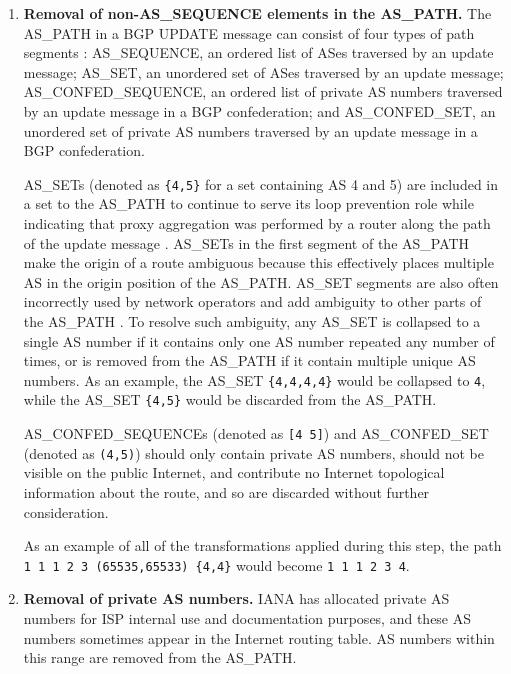 \begin{enumerate}
    \item{\textbf{Removal of non-AS\_SEQUENCE elements in the AS\_PATH.} The
    AS\_PATH in a BGP UPDATE message can consist of four types of path segments
    \cite{rfc5065}: AS\_SEQUENCE, an ordered list of ASes traversed by an
    update message; AS\_SET, an unordered set of ASes traversed by an update
    message; AS\_CONFED\_SEQUENCE, an ordered list of private AS numbers
    traversed by an update message in a BGP confederation; and AS\_CONFED\_SET,
    an unordered set of private AS numbers traversed by an update message in a
    BGP confederation.

    AS\_SETs (denoted as \verb!{4,5}! for a set containing AS 4 and 5) are
    included in a set to the AS\_PATH to continue to serve its loop prevention
    role while indicating that proxy aggregation was performed by a router along
    the path of the update message \cite{draft-deprecate-as-sets-04}. AS\_SETs
    in the first segment of the AS\_PATH make the origin of a route ambiguous
    because this effectively places multiple AS in the origin position of the
    AS\_PATH.  AS\_SET segments are also often incorrectly used by network
    operators and add ambiguity to other parts of the AS\_PATH
    \cite{draft-deprecate-as-sets-04}.  To resolve such ambiguity, any AS\_SET
    is collapsed to a single AS number if it contains only one AS number
    repeated any number of times, or is removed from the AS\_PATH if it contain
    multiple unique AS numbers. As an example, the AS\_SET \verb!{4,4,4,4}!
    would be collapsed to \verb!4!, while the AS\_SET \verb!{4,5}! would be
    discarded from the AS\_PATH.

    AS\_CONFED\_SEQUENCEs (denoted as \verb![4 5]!) and AS\_CONFED\_SET
    (denoted as \verb!(4,5)!) should only contain private AS numbers, should
    not be visible on the public Internet, and contribute no Internet
    topological information about the route, and so are discarded without
    further consideration.

    As an example of all of the transformations applied during this step, the
    path \\
    \verb!1 1 1 2 3 (65535,65533) {4,4}! would become \verb!1 1 1 2 3 4!.
    }

    \item{\textbf{Removal of private AS numbers.} IANA has allocated private AS
    numbers \cite{rfc1930,rfc5398} for ISP internal use and documentation
    purposes, and these AS numbers sometimes appear in the Internet routing
    table. AS numbers within this range are removed from the AS\_PATH.}


\end{enumerate}
